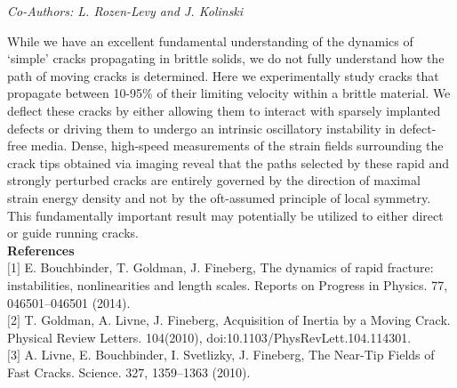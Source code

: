 \begin{center}
\textit{Co-Authors: L. Rozen-Levy and J. Kolinski}
\end{center} 
While we have an excellent fundamental understanding of the dynamics of ‘simple’ cracks propagating in brittle solids, we do not fully understand how the path of moving cracks is determined. Here we experimentally study cracks that propagate between 10-95\% of their limiting velocity within a brittle material. We deflect these cracks by either allowing them to interact with sparsely implanted defects or driving them to undergo an intrinsic oscillatory instability in defect-free media. Dense, high-speed measurements of the strain fields surrounding the crack tips obtained via imaging reveal that the paths selected by these rapid and strongly perturbed cracks are entirely governed by the direction of maximal strain energy density and not by the oft-assumed principle of local symmetry. This fundamentally important result may potentially be utilized to either direct or guide running cracks.\\

\noindent\textbf{References}\\
$[$1$]$ E. Bouchbinder, T. Goldman, J. Fineberg, The dynamics of rapid fracture: instabilities, nonlinearities and length scales. Reports on Progress in Physics. 77, 046501–046501 (2014).\\\newline
$[$2$]$ T. Goldman, A. Livne, J. Fineberg, Acquisition of Inertia by a Moving Crack. Physical Review Letters. 104(2010), doi:10.1103/PhysRevLett.104.114301.\\\newline
$[$3$]$ A. Livne, E. Bouchbinder, I. Svetlizky, J. Fineberg, The Near-Tip Fields of Fast Cracks. Science. 327, 1359–1363 (2010).
